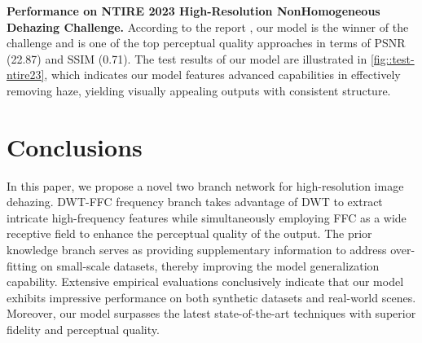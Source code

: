 \documentclass[10pt,twocolumn,letterpaper]{article}
\begin{document}
\textbf{Performance on NTIRE 2023 High-Resolution NonHomogeneous Dehazing Challenge.}
According to the report \cite{ntire23}, our model is the winner of the challenge and is one of the top perceptual quality approaches in terms of PSNR (22.87) and SSIM (0.71). The test results of our model are illustrated in \cref{fig::test-ntire23}, which indicates our model features advanced capabilities in effectively removing haze, yielding visually appealing outputs with consistent structure.

\section{Conclusions}
In this paper, we propose a novel two branch network for high-resolution image dehazing. DWT-FFC frequency branch takes advantage of DWT to extract intricate high-frequency features while simultaneously employing FFC as a wide receptive field to enhance the perceptual quality of the output. The prior knowledge branch serves as providing supplementary information to address over-fitting on small-scale datasets, thereby improving the model generalization capability. Extensive empirical evaluations conclusively indicate that our model exhibits impressive performance on both synthetic datasets and real-world scenes. Moreover, our model surpasses the latest state-of-the-art techniques with superior fidelity and perceptual quality.







\newpage
\newpage
{\small
\normalem


}
\end{document}
